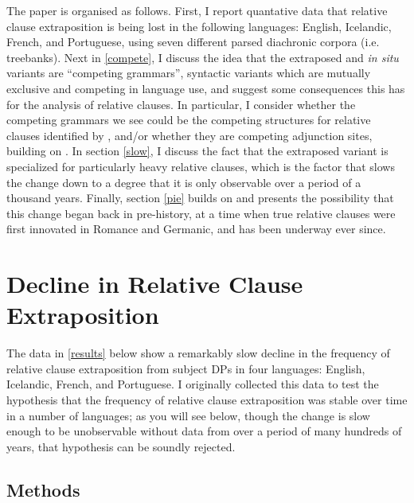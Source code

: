 The paper is organised as follows.
First, I report quantative data that relative clause extraposition is being lost in the following languages: English, Icelandic, French, and Portuguese, using seven different parsed diachronic corpora (i.e. treebanks).
Next in \ref{compete}, I discuss the idea that the extraposed and \textsl{in situ} variants are ``competing grammars'', syntactic variants which are mutually exclusive and competing in language use, and suggest some consequences this has for the analysis of relative clauses. In particular, I consider whether the competing grammars we see could be the competing structures for relative clauses identified by \citet{sauerland2003}, and/or whether they are competing adjunction sites, building on \citet{culicoverrochemont1990}.
In section \ref{slow}, I discuss the fact that the extraposed variant is specialized for particularly heavy relative clauses, which is the factor that slows the change down to a degree that it is only observable over a period of a thousand years.
Finally, section \ref{pie} builds on \citet{kiparsky1995} and presents the possibility that this change began back in pre-history, at a time when true relative clauses were first innovated in Romance and Germanic, and has been underway ever since.



\section{Decline in Relative Clause Extraposition}
\label{relclause}

The data in \ref{results} below show a remarkably slow decline in the frequency of relative clause extraposition from subject DPs in four languages: English, Icelandic, French, and Portuguese. I originally collected this data to test the hypothesis that the frequency of relative clause extraposition was stable over time in a number of languages; as you will see below, though the change is slow enough to be unobservable without data from over a period of many hundreds of years, that hypothesis can be soundly rejected.

\subsection{Methods}
\label{methods}

